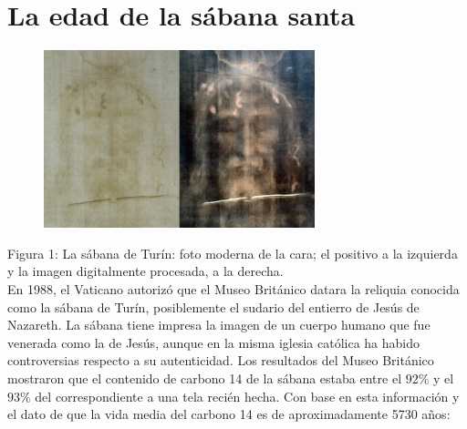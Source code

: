 \documentclass[12pt]{article}
\begin{document}
\section{La edad de la sábana santa}
\begin{figure}[h]
\centering
\includegraphics[width=0.7\textwidth]{img/sabanaSanta.png}
\end{figure}
Figura 1: La sábana de Turín: foto moderna de la cara; el positivo a la izquierda y la imagen digitalmente procesada, a la derecha.\\

En 1988, el Vaticano autorizó que el Museo Británico datara la reliquia conocida como la sábana de Turín, posiblemente el sudario del entierro de Jesús de Nazareth. La sábana tiene impresa la imagen de un cuerpo humano que fue venerada como la de Jesús, aunque en la misma iglesia católica ha habido controversias respecto a su autenticidad. Los resultados del Museo Británico mostraron que el contenido de carbono 14 de la sábana estaba entre el $92 \%$ y el $93 \%$ del correspondiente a una tela recién hecha. Con base en esta información y el dato de que la vida media del carbono 14 es de aproximadamente 5730 años:
\end{document}
